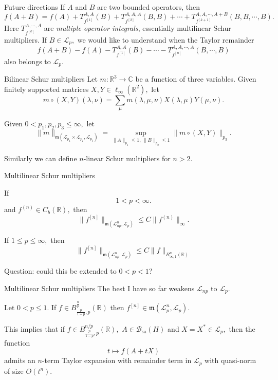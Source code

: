 \documentclass{beamer}
\numberwithin{equation}{section}
\theoremstyle{plain}
\theoremstyle{plain}
\theoremstyle{definition}
\theoremstyle{plain}
\theoremstyle{plain}
\theoremstyle{definition}
\newcommand{\Rl}{\mathbb{R}}
\newcommand{\Cplx}{\mathbb{C}}
\newcommand{\Bc}{\mathcal{B}}
\newcommand{\Lc}{\mathcal{L}}
\newcommand{\sa}{\mathrm{sa}}
\newcommand{\mf}{\mathfrak{m}}
\begin{document}
\begin{frame}{Future directions}
    If $A$ and $B$ are two bounded operators, then
    \[
        f(A+B) = f(A)+T^{A,A}_{f^{[1]}}(B)+T^{A,A,A}_{f^{[2]}}(B,B)+\cdots+T^{A,A,\cdots,A+B}_{f^{[k+1]}}(B,B,\cdots,B).
    \]
    Here $T^{A,\cdots,A}_{f^{[k]}}$ are \emph{multiple operator integrals}, essentially multilinear Schur multipliers.
    \pause
    If $B \in \Lc_p,$ we would like to understand when the Taylor remainder
    \[
        f(A+B)-f(A)-T^{A,A}_{f^{[1]}}(B)-\cdots -T^{A,A,\cdots,A}_{f^{[n]}}(B,\cdots,B)
    \]
    also belongs to $\Lc_p.$
\end{frame}

\begin{frame}{Bilinear Schur multipliers}
    Let $m:\Rl^3\to \Cplx$ be a function of three variables. Given finitely supported matrices $X,Y\in \ell_{\infty}(\Rl^2),$ let
    \[
        m\circ (X,Y)(\lambda,\nu) = \sum_{\mu} m(\lambda,\mu,\nu)X(\lambda,\mu)Y(\mu,\nu).
    \]
    \begin{definition}
        Given $0<p_1,p_2,p_3\leq \infty,$ let
        \[
            \|m\|_{\mf(\Lc_{p_1}\times \Lc_{p_2},\Lc_{p_3})} = \sup_{\|A\|_{p_1}\leq 1,\, \|B\|_{p_2}\leq 1} \|m\circ (X,Y)\|_{p_3}.
        \]
    \end{definition}
    Similarly we can define $n$-linear Schur multipliers for $n>2.$
\end{frame}

\begin{frame}{Multilinear Schur multipliers}
    \begin{theorem}
        If
        \[
            1<p<\infty.
        \]
        and $f^{(n)} \in C_b(\Rl),$ then
        \[
            \|f^{[n]}\|_{\mf(\Lc_{np}^n,\Lc_p)}\leq C\|f^{(n)}\|_{\infty}.
        \]
    \end{theorem}
    \begin{theorem}[Peller]
        If $1\leq p \leq \infty,$ then
        \[
            \|f^{[n]}\|_{\mf(\Lc_{np}^n,\Lc_p)}\leq C\|f\|_{B^n_{\infty,1}(\Rl)}
        \]
    \end{theorem}
    Question: could this be extended to $0<p<1$?
\end{frame}

\begin{frame}{Multilinear Schur multipliers}
    The best I have so far weakens $\Lc_{np}$ to $\Lc_p.$
    \begin{theorem}
        Let $0 < p \leq 1.$ If $f \in B^{\frac{n}{p}}_{\frac{p}{1-p},p}(\Rl)$ then
        $f^{[n]} \in \mf(\Lc_p^n,\Lc_p).$
    \end{theorem}
    This implies that if $f \in B^{n/p}_{\frac{p}{1-p},p}(\Rl),$ $A\in \Bc_{\sa}(H)$ and $X = X^* \in \Lc_p,$ then the function
    \[
        t\mapsto f(A+tX)
    \]
    admits an $n$-term Taylor expansion with remainder term in $\Lc_p$ with quasi-norm of size $O(t^n).$
\end{frame}



\begin{frame}
\end{frame}
\end{document}
